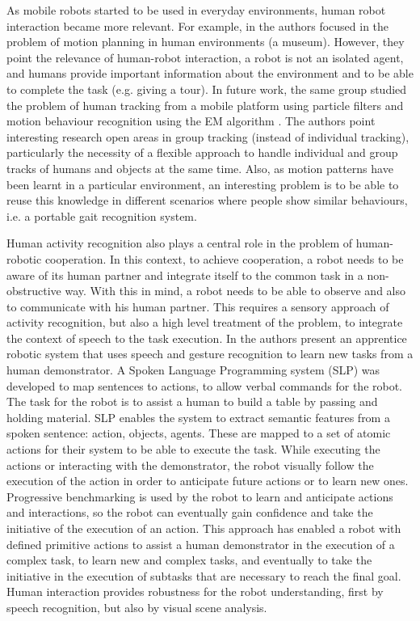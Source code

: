 As mobile robots started to be used in everyday environments, human robot interaction became more relevant. 
For example, in \citep{Burgard98_ExpMuseumRobot} the authors focused in the problem of motion planning in human environments (a museum). 
However, they point the relevance of human-robot interaction, a robot is not an isolated agent, and humans provide important information about the environment and to be able to complete the task (e.g. giving a tour). 
In future work, the same group studied the problem of human tracking from a mobile platform using particle filters \citep{Schulz01_TrackingMultipleMoving,Schulz03_PeopleTrackSJPDAF} and motion behaviour recognition using the EM algorithm \citep{BennewitzBT02,bennewitz2004active}.
The authors point interesting research open areas in group tracking (instead of individual tracking), particularly the necessity of a flexible approach to handle individual and group tracks of humans and objects at the same time.
Also, as motion patterns have been learnt in a particular environment, an interesting problem is to be able to reuse this knowledge in different scenarios where people show similar behaviours, i.e. a portable gait recognition system.

Human activity recognition also plays a central role in the problem of human-robotic cooperation.
In this context, to achieve cooperation, a robot needs to  be aware of its human partner and integrate itself to the common task in a non-obstructive way.
With this in mind, a robot needs to be able to observe and also to communicate with his human partner.
This requires a sensory approach of activity recognition, but also a high level treatment of the problem, to integrate the context of speech to the task execution.
In \citep{Lalle2010_HRI} the authors present an apprentice robotic system that uses speech and gesture recognition to learn new tasks from a human demonstrator. 
A Spoken Language Programming system (SLP) was developed \citep{Dominey2007_RTCBA} to map sentences to actions, to allow verbal commands for the robot.
The task for the robot is to assist a human to build a table by passing and holding material.
SLP enables the system to extract semantic features from a spoken sentence: action, objects, agents. %
These are mapped to a set of atomic actions for their system to be able to execute the task.
While executing the actions or interacting with the demonstrator, the robot visually follow the execution of the action in order to anticipate future actions or to learn new ones.
Progressive benchmarking is used by the robot to learn and anticipate actions and interactions, so the robot can eventually gain confidence and take the initiative of the execution of an action.
This approach has enabled a robot with defined primitive actions to assist a human demonstrator in the execution of a complex task, to learn new and complex tasks, and eventually to take the initiative in the execution of subtasks that are necessary to reach the final goal.
Human interaction provides robustness for the robot understanding, first by speech recognition, but also by visual scene analysis.

